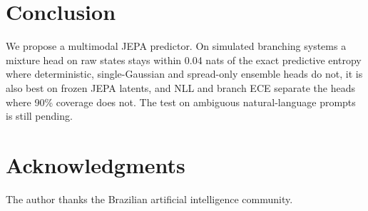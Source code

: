 \documentclass[conference]{IEEEtran}
\begin{document}
\section{Conclusion}
We propose a multimodal JEPA predictor. On simulated branching systems a mixture head on raw states stays within 0.04 nats of the exact predictive entropy where deterministic, single-Gaussian and spread-only ensemble heads do not, it is also best on frozen JEPA latents, and NLL and branch ECE separate the heads where 90\% coverage does not. The test on ambiguous natural-language prompts is still pending.

\section*{Acknowledgments}
The author thanks the Brazilian artificial intelligence community.

\nocite{ctl_full_names}


\end{document}
